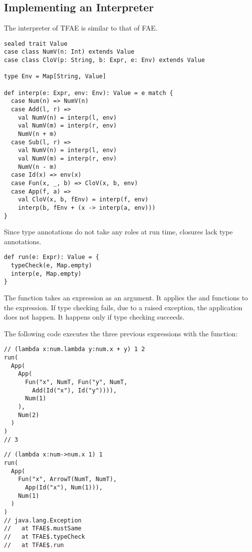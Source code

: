 \subsection{Implementing an Interpreter}

The interpreter of TFAE is similar to that of FAE.

\begin{verbatim}
sealed trait Value
case class NumV(n: Int) extends Value
case class CloV(p: String, b: Expr, e: Env) extends Value

type Env = Map[String, Value]

def interp(e: Expr, env: Env): Value = e match {
  case Num(n) => NumV(n)
  case Add(l, r) =>
    val NumV(n) = interp(l, env)
    val NumV(m) = interp(r, env)
    NumV(n + m)
  case Sub(l, r) =>
    val NumV(n) = interp(l, env)
    val NumV(m) = interp(r, env)
    NumV(n - m)
  case Id(x) => env(x)
  case Fun(x, _, b) => CloV(x, b, env)
  case App(f, a) =>
    val CloV(x, b, fEnv) = interp(f, env)
    interp(b, fEnv + (x -> interp(a, env)))
}
\end{verbatim}

Since type annotations do not take any roles at run time, closures lack type
annotations.

\begin{verbatim}
def run(e: Expr): Value = {
  typeCheck(e, Map.empty)
  interp(e, Map.empty)
}
\end{verbatim}

The  function takes an expression as an argument. It applies the
 and  functions to the expression. If type checking
fails, due to a raised exception, the application  does not happen.
It happens only if type checking succeeds.

The following code executes the three previous expressions with the 
function:

\begin{verbatim}
// (lambda x:num.lambda y:num.x + y) 1 2
run(
  App(
    App(
      Fun("x", NumT, Fun("y", NumT,
        Add(Id("x"), Id("y")))),
      Num(1)
    ),
    Num(2)
  )
)
// 3
\end{verbatim}

\begin{verbatim}
// (lambda x:num->num.x 1) 1
run(
  App(
    Fun("x", ArrowT(NumT, NumT),
      App(Id("x"), Num(1))),
    Num(1)
  )
)
// java.lang.Exception
//   at TFAE$.mustSame
//   at TFAE$.typeCheck
//   at TFAE$.run
\end{verbatim}

